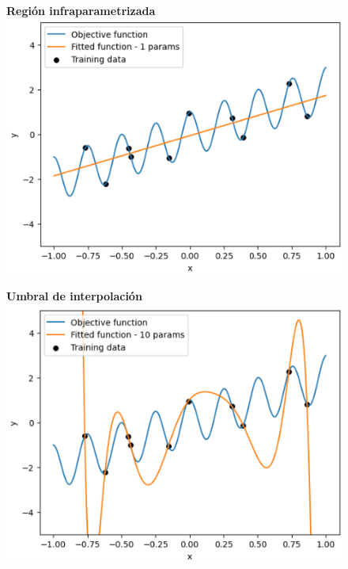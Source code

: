 \begin{figure}[h]
    \centering
    \begin{minipage}{0.32\textwidth}
        \centering
        \textbf{Región infraparametrizada} \\[0.5ex] 
        \includegraphics[width=\linewidth]{img/experiments/OLS1.1.png}
    \end{minipage}
    \begin{minipage}{0.32\textwidth}
        \centering
        \textbf{Umbral de interpolación} \\[0.5ex] 
        \includegraphics[width=\linewidth]{img/experiments/OLS1.2.png}
    \end{minipage}

\end{figure}
